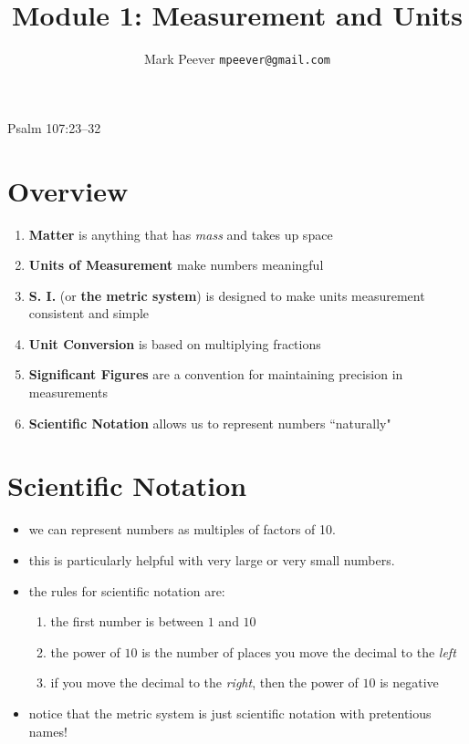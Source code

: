 \documentclass[11pt, oneside]{article}   	%
\title{Module 1: Measurement and Units}
\author{Mark Peever \texttt{mpeever@gmail.com}}
\begin{document}
\maketitle

\begin{center}
Psalm 107:23--32
\end{center}

\section{Overview}

\begin{enumerate}
\item \textbf{Matter} is anything that has \emph{mass} and takes up space
\item \textbf{Units of Measurement} make numbers meaningful
\item \textbf{S. I.} (or \textbf{the metric system}) is designed to make units measurement consistent and simple
\item \textbf{Unit Conversion} is based on multiplying fractions
\item \textbf{Significant Figures} are a convention for maintaining precision in measurements
\item \textbf{Scientific Notation} allows us to represent numbers ``naturally"   
\end{enumerate}

\section{Scientific Notation}
\begin{itemize}
\item we can represent numbers as multiples of factors of 10.
\item this is particularly helpful with very large or very small numbers.
\item the rules for scientific notation are:
\begin{enumerate}
\item the first number is between $ 1 $ and $ 10 $
\item  the power of $ 10 $ is the number of places you move the decimal to the \emph{left}
\item if you move the decimal to the \emph{right}, then the power of $ 10 $ is negative
\end{enumerate}
\item notice that the metric system is just scientific notation with pretentious names!
 \end{itemize}
\end{document}

